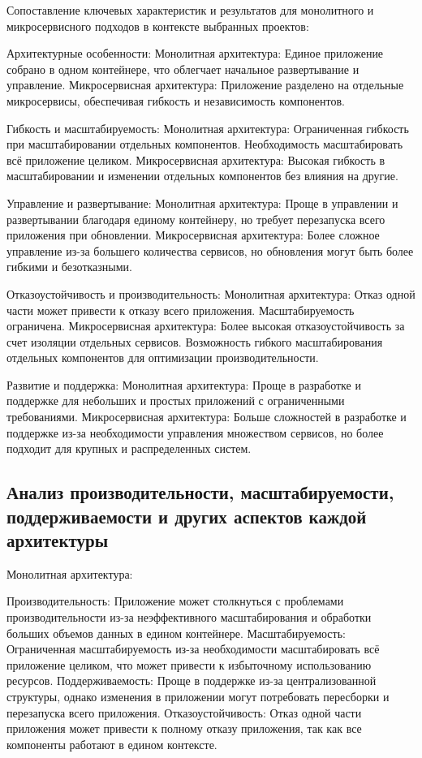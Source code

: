    Сопоставление ключевых характеристик и результатов для монолитного и микросервисного подходов в контексте выбранных проектов:

    Архитектурные особенности:
        Монолитная архитектура: Единое приложение собрано в одном контейнере, что облегчает начальное развертывание и управление.
        Микросервисная архитектура: Приложение разделено на отдельные микросервисы, обеспечивая гибкость и независимость компонентов.

    Гибкость и масштабируемость:
        Монолитная архитектура: Ограниченная гибкость при масштабировании отдельных компонентов. Необходимость масштабировать всё приложение целиком.
        Микросервисная архитектура: Высокая гибкость в масштабировании и изменении отдельных компонентов без влияния на другие.

    Управление и развертывание:
        Монолитная архитектура: Проще в управлении и развертывании благодаря единому контейнеру, но требует перезапуска всего приложения при обновлении.
        Микросервисная архитектура: Более сложное управление из-за большего количества сервисов, но обновления могут быть более гибкими и безотказными.

    Отказоустойчивость и производительность:
        Монолитная архитектура: Отказ одной части может привести к отказу всего приложения. Масштабируемость ограничена.
        Микросервисная архитектура: Более высокая отказоустойчивость за счет изоляции отдельных сервисов. Возможность гибкого масштабирования отдельных компонентов для оптимизации производительности.

    Развитие и поддержка:
        Монолитная архитектура: Проще в разработке и поддержке для небольших и простых приложений с ограниченными требованиями.
        Микросервисная архитектура: Больше сложностей в разработке и поддержке из-за необходимости управления множеством сервисов, но более подходит для крупных и распределенных систем.

\subsection{Анализ производительности, масштабируемости, поддерживаемости и других аспектов каждой архитектуры}
    Монолитная архитектура:
    
        Производительность: Приложение может столкнуться с проблемами производительности из-за неэффективного масштабирования и обработки больших объемов данных в едином контейнере.
        Масштабируемость: Ограниченная масштабируемость из-за необходимости масштабировать всё приложение целиком, что может привести к избыточному использованию ресурсов.
        Поддерживаемость: Проще в поддержке из-за централизованной структуры, однако изменения в приложении могут потребовать пересборки и перезапуска всего приложения.
        Отказоустойчивость: Отказ одной части приложения может привести к полному отказу приложения, так как все компоненты работают в едином контексте.
    
